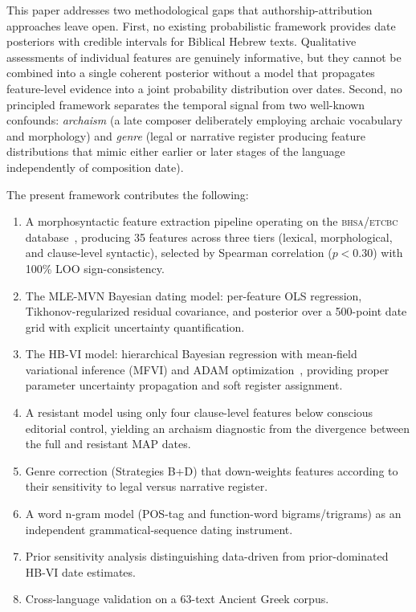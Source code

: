 \documentclass[10pt,letterpaper]{article}
\newcommand{\bhsa}{\textsc{bhsa}}
\newcommand{\mvn}{MLE-MVN}
\newcommand{\hbvi}{HB-VI}
\begin{document}
This paper addresses two methodological gaps that authorship-attribution
approaches leave open.  First, no existing probabilistic framework
provides date posteriors with credible intervals for Biblical Hebrew texts.
Qualitative assessments of individual features are genuinely informative,
but they cannot be combined into a single coherent posterior without a
model that propagates feature-level evidence into a joint probability
distribution over dates.  Second, no principled framework separates the
temporal signal from two well-known confounds:
\emph{archaism} (a late composer deliberately employing archaic vocabulary
and morphology) and \emph{genre} (legal or narrative register producing
feature distributions that mimic either earlier or later stages of the
language independently of composition date).

The present framework contributes the following:
\begin{enumerate}
  \item A morphosyntactic feature extraction pipeline operating on the
    \bhsa{}/\textsc{etcbc} database~\cite{BHSA2021,Roorda2018}, producing
    35 features across three tiers (lexical, morphological, and
    clause-level syntactic), selected by Spearman correlation ($p < 0.30$)
    with 100\% LOO sign-consistency.
  \item The \mvn{} Bayesian dating model: per-feature OLS regression,
    Tikhonov-regularized residual covariance, and posterior over a
    500-point date grid with explicit uncertainty quantification.
  \item The \hbvi{} model: hierarchical Bayesian regression with
    mean-field variational inference (MFVI) and ADAM
    optimization~\cite{Kingma2014,Blei2017}, providing proper parameter
    uncertainty propagation and soft register assignment.
  \item A resistant model using only four clause-level features below
    conscious editorial control, yielding an archaism diagnostic from the
    divergence between the full and resistant MAP dates.
  \item Genre correction (Strategies B+D) that down-weights features
    according to their sensitivity to legal versus narrative register.
  \item A word n-gram model (POS-tag and function-word bigrams/trigrams)
    as an independent grammatical-sequence dating instrument.
  \item Prior sensitivity analysis distinguishing data-driven from
    prior-dominated \hbvi{} date estimates.
  \item Cross-language validation on a 63-text Ancient Greek corpus.
\end{enumerate}
\end{document}
